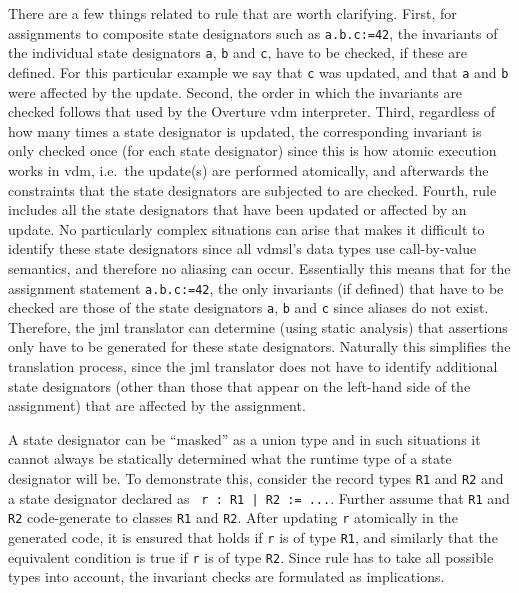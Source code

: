 There are a few things related to rule  that are
worth clarifying. First, for assignments to composite state
designators such as \texttt{a.b.c:=42}, the invariants of the
individual state designators \texttt{a}, \texttt{b} and \texttt{c},
have to be checked, if these are defined. For this particular example
we say that \texttt{c} was updated, and that \texttt{a} and \texttt{b}
were affected by the update. Second, the order in which the invariants
are checked follows that used by the Overture \ac{vdm} interpreter. Third,
regardless of how many times a state designator is updated, the
corresponding invariant is only checked once (for each state
designator) since this is how atomic execution works in \ac{vdm},
i.e.\ the update(s) are performed atomically, and afterwards the
constraints that the state designators are subjected to are
checked. Fourth, rule  includes all the state
designators that have been updated or affected by an update. No
particularly complex situations can arise that makes it difficult to
identify these state designators since all \ac{vdmsl}'s data types use
call-by-value semantics, and therefore no aliasing can
occur. Essentially this means that for the assignment statement
\texttt{a.b.c:=42}, the only invariants (if defined) that have to be checked are
those of the state designators \texttt{a}, \texttt{b} and \texttt{c}
 since aliases do not exist. Therefore, the \ac{jml}
translator can determine (using static analysis) that assertions only
have to be generated for these state designators. Naturally this
simplifies the translation process, since the \ac{jml} translator does
not have to identify additional state designators (other than those
that appear on the left-hand side of the assignment) that are affected
by the assignment.

A state designator can be ``masked'' as a union type and in such
situations it cannot always be statically determined what the runtime
type of a state designator will be. To demonstrate this, consider the
record types \texttt{R1} and \texttt{R2} and a state designator
declared as \texttt{ r : R1 | R2 := ...}. Further assume that
\texttt{R1} and \texttt{R2} code-generate to classes
\texttt{R1} and \texttt{R2}. After updating \texttt{r}
atomically in the generated code, it is ensured that  holds if \texttt{r} is of type \texttt{R1}, and similarly
that the equivalent condition is true if \texttt{r} is of type
\texttt{R2}. Since rule  has to take all
possible types into account, the invariant checks are formulated as
implications.

